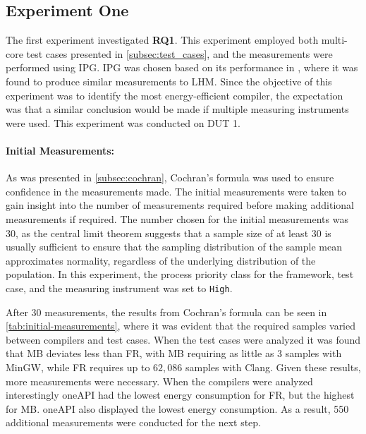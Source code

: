 \subsection{Experiment One}\label{subsec:exp_one}

The first experiment investigated \textbf{RQ1}. This experiment employed both multi-core test cases presented in \cref{subsec:test_cases}, and the measurements were performed using IPG. IPG was chosen based on its performance in \cite{biksbois}, where it was found to produce similar measurements to LHM. Since the objective of this experiment was to identify the most energy-efficient compiler, the expectation was that a similar conclusion would be made if multiple measuring instruments were used. This experiment was conducted on DUT 1.  

\paragraph{Initial Measurements:} As was presented in \cref{subsec:cochran}, Cochran's formula was used to ensure confidence in the measurements made. The initial measurements were taken to gain insight into the number of measurements required before making additional measurements if required. The number chosen for the initial measurements was 30, as the central limit theorem suggests that a sample size of at least 30 is usually sufficient to ensure that the sampling distribution of the sample mean approximates normality, regardless of the underlying distribution of the population\cite{central-limit-theorem}. In this experiment, the process priority class for the framework, test case, and the measuring instrument was set to \texttt{High}.



After 30 measurements, the results from Cochran's formula can be seen in \cref{tab:initial-measurements}, where it was evident that the required samples varied between compilers and test cases. When the test cases were analyzed it was found that MB deviates less than FR, with MB requiring as little as $3$ samples with MinGW, while FR requires up to $62,086$ samples with Clang. Given these results, more measurements were necessary. When the compilers were analyzed interestingly oneAPI had the lowest energy consumption for FR, but the highest for MB. oneAPI also displayed the lowest energy consumption. As a result, 550 additional measurements were conducted for the next step.

